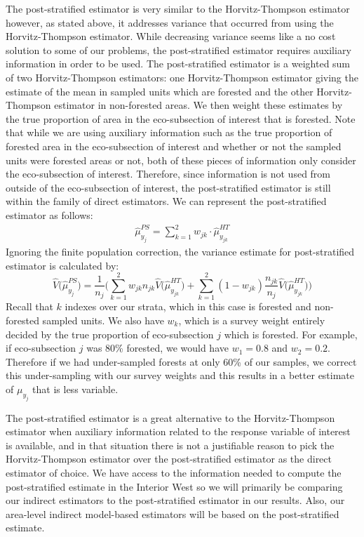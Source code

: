 \documentclass[12pt,twoside]{reedthesis}
\begin{document}
The post-stratified estimator is very similar to the Horvitz-Thompson estimator however, as stated above, it addresses variance that occurred from using the Horvitz-Thompson estimator. While decreasing variance seems like a no cost solution to some of our problems, the post-stratified estimator requires auxiliary information in order to be used. The post-stratified estimator is a weighted sum of two Horvitz-Thompson estimators: one Horvitz-Thompson estimator giving the estimate of the mean in sampled units which are forested and the other Horvitz-Thompson estimator in non-forested areas. We then weight these estimates by the true proportion of area in the eco-subsection of interest that is forested. Note that while we are using auxiliary information such as the true proportion of forested area in the eco-subsection of interest and whether or not the sampled units were forested areas or not, both of these pieces of information only consider the eco-subsection of interest. Therefore, since information is not used from outside of the eco-subsection of interest, the post-stratified estimator is still within the family of direct estimators. We can represent the post-stratified estimator as follows:
\begin{align}
\hat\mu_{y_j}^{PS} = \sum_{k=1}^{2} w_{jk} \cdot \hat\mu_{y_{jk}}^{HT}
\end{align}
Ignoring the finite population correction, the variance estimate for post-stratified estimator is calculated by:
\[
\hat V\Big(\hat \mu_{y_j}^{PS}\Big) = 
\frac{1}{n_j} \Bigg( \sum_{k=1}^{2} w_{jk} n_{jk} \hat V\Big(\hat\mu_{y_{jk}}^{HT}\Big) + 
\sum_{k=1}^{2} (1 - w_{jk}) \frac{n_{jk}}{n_j} \hat V\Big(\hat\mu_{y_{jk}}^{HT}\Big) \Bigg)
\]
Recall that \(k\) indexes over our strata, which in this case is forested and non-forested sampled units. We also have \(w_k\), which is a survey weight entirely decided by the true proportion of eco-subsection \(j\) which is forested. For example, if eco-subsection \(j\) was 80\% forested, we would have \(w_1 = 0.8\) and \(w_2 = 0.2\). Therefore if we had under-sampled forests at only 60\% of our samples, we correct this under-sampling with our survey weights and this results in a better estimate of \(\mu_{y_j}\) that is less variable.

The post-stratified estimator is a great alternative to the Horvitz-Thompson estimator when auxiliary information related to the response variable of interest is available, and in that situation there is not a justifiable reason to pick the Horvitz-Thompson estimator over the post-stratified estimator as the direct estimator of choice. We have access to the information needed to compute the post-stratified estimate in the Interior West so we will primarily be comparing our indirect estimators to the post-stratified estimator in our results. Also, our area-level indirect model-based estimators will be based on the post-stratified estimate.
\end{document}
